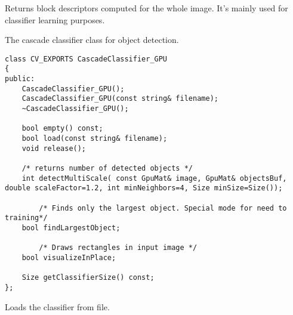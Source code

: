 Returns block descriptors computed for the whole image. It's mainly used for classifier learning purposes.


\begin{description}
\end{description}


The cascade classifier class for object detection.

\begin{lstlisting}
class CV_EXPORTS CascadeClassifier_GPU
{
public:            
	CascadeClassifier_GPU();
	CascadeClassifier_GPU(const string& filename);
	~CascadeClassifier_GPU();

	bool empty() const;
	bool load(const string& filename);
	void release();
	
	/* returns number of detected objects */
	int detectMultiScale( const GpuMat& image, GpuMat& objectsBuf, double scaleFactor=1.2, int minNeighbors=4, Size minSize=Size());
					
        /* Finds only the largest object. Special mode for need to training*/		
	bool findLargestObject;

        /* Draws rectangles in input image */		
	bool visualizeInPlace;

	Size getClassifierSize() const;	
};
\end{lstlisting}

\par
Loads the classifier from file.
\begin{description}
\end{description}

